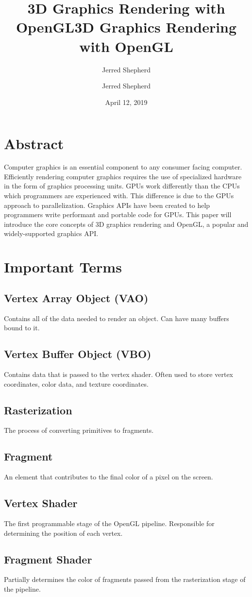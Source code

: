 \documentclass{article}
\title{\Large\textbf{3D Graphics Rendering with OpenGL}}
\author{Jerred Shepherd}
\begin{document}
  \title{3D Graphics Rendering with OpenGL}
  \author{Jerred Shepherd}
  \date{April 12, 2019}
  \maketitle
  
  \section{Abstract}
  Computer graphics is an essential component to any consumer facing computer. Efficiently rendering computer graphics requires the use of specialized hardware in the form of graphics processing units. GPUs work differently than the CPUs which programmers are experienced with. This difference is due to the GPUs approach to parallelization. Graphics APIs have been created to help programmers write performant and portable code for GPUs. This paper will introduce the core concepts of 3D graphics rendering and OpenGL, a popular and widely-supported graphics API.
  
  \section{Important Terms}
  \subsection{Vertex Array Object (VAO)}
  Contains all of the data needed to render an object. Can have many buffers bound to it.
  \subsection{Vertex Buffer Object (VBO)}
  Contains data that is passed to the vertex shader. Often used to store vertex coordinates, color data, and texture coordinates.
  \subsection{Rasterization}
  The process of converting primitives to fragments.
  \subsection{Fragment}
  An element that contributes to the final color of a pixel on the screen.
  \subsection{Vertex Shader}
  The first programmable stage of the OpenGL pipeline. Responsible for determining the position of each vertex.
  \subsection{Fragment Shader}
  Partially determines the color of fragments passed from the rasterization stage of the pipeline.
  \clearpage
    
  \nocite{*}
  {}
  
  
\end{document}
